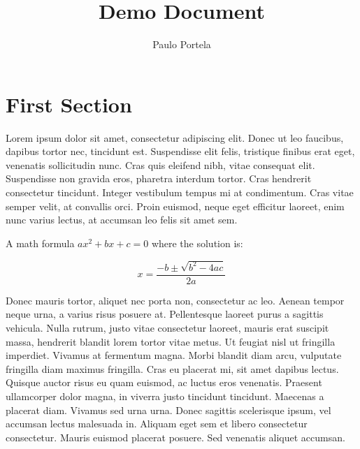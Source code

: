 \documentclass{article}
\begin{document}
	\title{Demo Document}  %
	\author{Paulo Portela}  %
	\maketitle  %
	\thispagestyle{empty}  %
	\newpage
	
	\setcounter{page}{1}  %
	
	\tableofcontents
	\newpage
	
	\setcounter{page}{1}  %
	
	\section{First Section}
	
	Lorem ipsum dolor sit amet, consectetur adipiscing elit. Donec ut leo faucibus, dapibus tortor nec, tincidunt est. Suspendisse elit felis, tristique finibus erat eget, venenatis sollicitudin nunc. Cras quis eleifend nibh, vitae consequat elit. Suspendisse non gravida eros, pharetra interdum tortor. Cras hendrerit consectetur tincidunt. Integer vestibulum tempus mi at condimentum. Cras vitae semper velit, at convallis orci. Proin euismod, neque eget efficitur laoreet, enim nunc varius lectus, at accumsan leo felis sit amet sem.
	
	A math formula $ ax^2 + bx + c = 0 $ where the solution is:
	
	\begin{equation}
		x = \frac{-b \pm \sqrt{b^2 - 4ac}}{2a}
	\end{equation}
	
	Donec mauris tortor, aliquet nec porta non, consectetur ac leo. Aenean tempor neque urna, a varius risus posuere at. Pellentesque laoreet purus a sagittis vehicula. Nulla rutrum, justo vitae consectetur laoreet, mauris erat suscipit massa, hendrerit blandit lorem tortor vitae metus. Ut feugiat nisl ut fringilla imperdiet. Vivamus at fermentum magna. Morbi blandit diam arcu, vulputate fringilla diam maximus fringilla. Cras eu placerat mi, sit amet dapibus lectus. Quisque auctor risus eu quam euismod, ac luctus eros venenatis. Praesent ullamcorper dolor magna, in viverra justo tincidunt tincidunt. Maecenas a placerat diam. Vivamus sed urna urna. Donec sagittis scelerisque ipsum, vel accumsan lectus malesuada in. Aliquam eget sem et libero consectetur consectetur. Mauris euismod placerat posuere. Sed venenatis aliquet accumsan.
	
\end{document}
